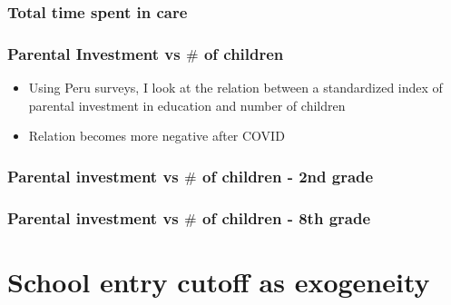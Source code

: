 \documentclass{beamer}
\begin{document}
\begin{frame}
    \label{update_scott}
    \frametitle{Total time spent in care}
        {
    }
\end{frame}

\begin{frame}
    \frametitle{Parental Investment vs $\#$ of children}
    \begin{itemize}
        \item Using Peru surveys, I look at the relation between a standardized index of parental investment in education and number of children
        \item Relation becomes more negative after COVID
    \end{itemize}
\end{frame}

\begin{frame}
    \frametitle{Parental investment vs $\#$ of children - 2nd grade}
    
\end{frame}

\begin{frame}
    \frametitle{Parental investment vs $\#$  of children - 8th grade}
    
\end{frame}







\section{School entry cutoff as exogeneity}
\end{document}
